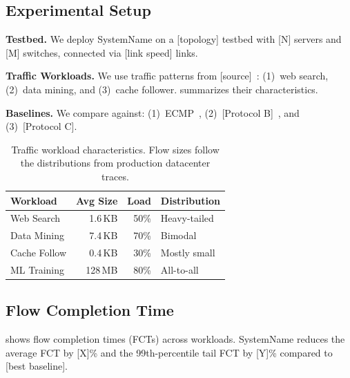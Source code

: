 \documentclass[letterpaper,twocolumn,10pt]{article}
\newcommand{\system}{SystemName\xspace}
\newcommand{\para}[1]{\smallskip\noindent\textbf{#1.}}
\begin{document}
\subsection{Experimental Setup}
\label{sec:eval:setup}

\para{Testbed}
We deploy \system on a [topology] testbed with [N] servers and [M]
switches, connected via [link speed] links.

\para{Traffic Workloads}
We use traffic patterns from [source]~\cite{alizadeh2010dctcp}:
(1)~web search, (2)~data mining, and (3)~cache follower.
 summarizes their characteristics.

\para{Baselines}
We compare against:
(1)~ECMP~\cite{hopps2000rfc},
(2)~[Protocol B]~\cite{jain2013b4}, and
(3)~[Protocol C].

\begin{table}[t]
  \caption{Traffic workload characteristics. Flow sizes follow
    the distributions from production datacenter traces.}
  \label{tab:workloads}
  \centering
  \begin{small}
  \begin{tabular}{@{}lrrl@{}}
    \toprule
    \textbf{Workload} & \textbf{Avg Size} & \textbf{Load} &
    \textbf{Distribution} \\
    \midrule
    Web Search   & 1.6\,KB  & 50\%  & Heavy-tailed  \\
    Data Mining   & 7.4\,KB  & 70\%  & Bimodal       \\
    Cache Follow  & 0.4\,KB  & 30\%  & Mostly small  \\
    ML Training   & 128\,MB  & 80\%  & All-to-all    \\
    \bottomrule
  \end{tabular}
  \end{small}
\end{table}

\subsection{Flow Completion Time}
\label{sec:eval:fct}

 shows flow completion times (FCTs) across workloads.
\system reduces the average FCT by [X]\% and the 99th-percentile
tail FCT by [Y]\% compared to [best baseline].
\end{document}
